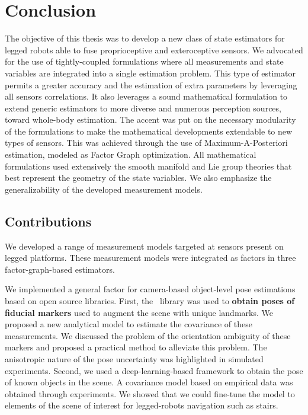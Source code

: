 \chapter{Conclusion}

The objective of this thesis was to develop a new class of state estimators for legged robots able to fuse proprioceptive and exteroceptive
sensors. We advocated for the use of tightly-coupled formulations where all measurements and state variables are integrated into a single estimation 
problem. This type of estimator permits a greater accuracy and the estimation of extra parameters by leveraging all sensors correlations.
It also leverages a sound mathematical formulation to extend generic estimators to more diverse and numerous perception sources, toward whole-body estimation.
The accent was put on the necessary modularity of the formulations to make the mathematical developments extendable to new types of sensors. This 
was achieved through the use of Maximum-A-Posteriori estimation, modeled as Factor Graph optimization. All mathematical formulations used extensively the smooth manifold
and Lie group theories that best represent the geometry of the state variables. We also emphasize the generalizability of the developed measurement models. 

\section{Contributions}

We developed a range of measurement models targeted at sensors present on legged platforms. These measurement models were integrated as factors in 
three factor-graph-based estimators.

We implemented a general factor for camera-based object-level pose estimations based on open source libraries. 
First, the \apriltag\ library was used 
to \textbf{obtain poses of fiducial markers} used to augment the scene with unique landmarks. We proposed a new analytical model to estimate the covariance of 
these measurements. We discussed the problem of the orientation ambiguity of these markers and proposed a practical method to alleviate this problem.
The anisotropic nature of the pose uncertainty was highlighted in simulated experiments. 
Second, we used a deep-learning-based framework to obtain the pose of known objects in the scene. A covariance model based on empirical data was obtained through
experiments. We showed that we could fine-tune the model to elements of the scene of interest for legged-robots navigation such as stairs.

